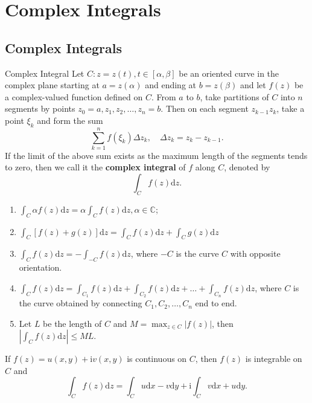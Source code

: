 \chapter{Complex Integrals} %
\section{Complex Integrals} %
\begin{definition}{Complex Integral}
    Let \(C: z=z(t), t\in [\alpha, \beta]\) be an oriented curve in the complex plane 
    starting at \(a=z(\alpha)\) and ending at \(b=z(\beta)\)
    and let \(f(z)\) be a complex-valued function defined on \(C\).
    From \(a\) to \(b\), take partitions of \(C\) into \(n\) segments by points \(z_0=a, z_1, z_2, \dots, z_n=b\).
    Then on each segment \(z_{k-1}z_k\), take a point \(\xi_k\) and form the sum
    \[
        \sum_{k=1}^n f(\xi_k)\Delta z_{k}, \quad \Delta z_{k} = z_k - z_{k-1}.
    \]   
    If the limit of the above sum exists as the maximum length of the segments tends to zero, 
    then we call it the \textbf{complex integral} of \(f\) along \(C\), denoted by
    \[
        \int_C f(z) \mathrm{d}z.
    \]
\end{definition}

\begin{property}
    \begin{enumerate}
        \item \(\int_C \alpha f(z) \mathrm{d}z = \alpha \int_C f(z) \mathrm{d}z, \alpha \in \mathbb{C}\); 
        \item \(\int_C [f(z) + g(z)] \mathrm{d}z = \int_C f(z) \mathrm{d}z + \int_C g(z) \mathrm{d}z\)
        \item \(\int_C f(z) \mathrm{d}z = -\int_{-C} f(z) \mathrm{d}z\), where \(-C\) is the curve \(C\) with opposite orientation.
        \item \(\int_C f(z) \mathrm{d}z = \int_{C_{1}} f(z) \mathrm{d}z + \int_{C_{2}} f(z) \mathrm{d}z + \ldots + \int_{C_{n}} f(z) \mathrm{d}z\), 
            where \(C\) is the curve obtained by connecting \(C_1, C_2, \dots, C_n\) end to end.
        \item Let \(L\) be the length of \(C\) and \(M = \max_{z \in C} |f(z)|\), 
            then \(\left|\int_C f(z) \mathrm{d}z\right| \leq ML\).
    \end{enumerate}
\end{property}

\begin{theorem}
    If \(f(z) = u(x, y) + \mathrm{i} v(x, y)\) is continuous on \(C\), then \(f(z)\) is integrable on \(C\) and
    \[
        \int_C f(z) \mathrm{d}z = \int_C u \mathrm{d}x - v \mathrm{d}y + \mathrm{i} \int_C v \mathrm{d}x + u \mathrm{d}y.
    \]
\end{theorem}

